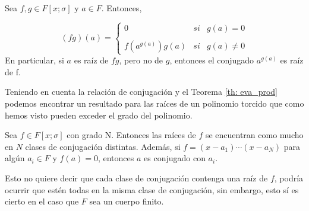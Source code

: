 \begin{theorem}
\label{th: eva_prod}
    Sea $f,g \in F[x;\sigma]$ y $a \in F$. Entonces,

   \[ (fg)(a)= \left\{ \begin{array}{lcc}
             0 &   si  & g(a) = 0 \\
             \\ f(a^{g(a)})g(a) &  si & g(a) \neq 0 
             \end{array}
   \right. \]
En particular, si $a$ es raíz de $fg$, pero no de $g$, entonces el conjugado $a^{g(a)}$ es raíz de f.
\end{theorem}

Teniendo en cuenta la relación de conjugación y el Teorema \ref{th: eva_prod} podemos encontrar un resultado para las raíces de un polinomio torcido que como hemos visto pueden exceder el grado del polinomio.

\begin{theorem}
Sea $f \in F[x;\sigma]$ con grado N. Entonces las raíces de $f$ se encuentran como mucho en $N$ clases de conjugación distintas. Además, si $f=(x-a_1)\cdots (x-a_N)$  para algún $a_i \in F$ y $f(a) = 0$, entonces $a$ es conjugado con $a_i$.
\end{theorem}

Esto no quiere decir que cada clase de conjugación contenga una raíz de $f$, podría ocurrir que estén todas en la misma clase de conjugación, sin embargo, esto sí es cierto en el caso que $F$ sea un cuerpo finito.

